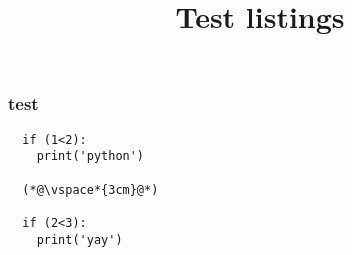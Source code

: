 \documentclass[table,dvipsnames]{beamer}
\title[Test listings]{Test listings}
\subtitle{ }
\author{ }
\institute{ }
\date{ }
\begin{document}
\begin{frame}[fragile]
\frametitle{test}
  \begin{lstlisting}
  if (1<2):
    print('python')

  (*@\vspace*{3cm}@*)

  if (2<3):
    print('yay')
  \end{lstlisting}
\end{frame}
\end{document}
